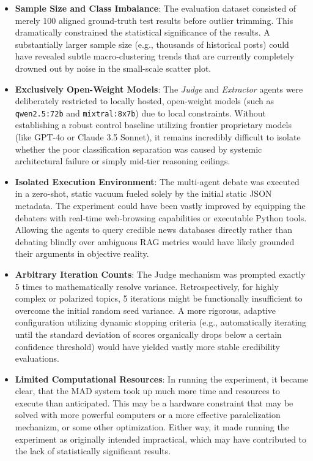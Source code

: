 \documentclass[sigconf,nonacm]{acmart}
\begin{document}
\begin{itemize}
    \item \textbf{Sample Size and Class Imbalance}: The evaluation dataset consisted of merely 100 aligned ground-truth test results before outlier trimming. This dramatically constrained the statistical significance of the results. A substantially larger sample size (e.g., thousands of historical posts) could have revealed subtle macro-clustering trends that are currently completely drowned out by noise in the small-scale scatter plot.
    \item \textbf{Exclusively Open-Weight Models}: The \textit{Judge} and \textit{Extractor} agents were deliberately restricted to locally hosted, open-weight models (such as \texttt{qwen2.5:72b} and \texttt{mixtral:8x7b}) due to local constraints. Without establishing a robust control baseline utilizing frontier proprietary models (like GPT-4o or Claude 3.5 Sonnet), it remains incredibly difficult to isolate whether the poor classification separation was caused by systemic architectural failure or simply mid-tier reasoning ceilings.
    \item \textbf{Isolated Execution Environment}: The multi-agent debate was executed in a zero-shot, static vacuum fueled solely by the initial static JSON metadata. The experiment could have been vastly improved by equipping the debaters with real-time web-browsing capabilities or executable Python tools. Allowing the agents to query credible news databases directly rather than debating blindly over ambiguous RAG metrics would have likely grounded their arguments in objective reality.
    \item \textbf{Arbitrary Iteration Counts}: The Judge mechanism was prompted exactly 5 times to mathematically resolve variance. Retrospectively, for highly complex or polarized topics, 5 iterations might be functionally insufficient to overcome the initial random seed variance. A more rigorous, adaptive configuration utilizing dynamic stopping criteria (e.g., automatically iterating until the standard deviation of scores organically drops below a certain confidence threshold) would have yielded vastly more stable credibility evaluations.
    \item \textbf{Limited Computational Resources}: In running the experiment, it became clear, that the MAD system took up much more time and resources to execute than anticipated. This may be a hardware constraint that may be solved with more powerful computers or a more effective paralelization mechanizm, or some other optimization. Either way, it made running the experiment as originally intended impractical, which may have contributed to the lack of statistically significant results.
\end{itemize}
\end{document}
